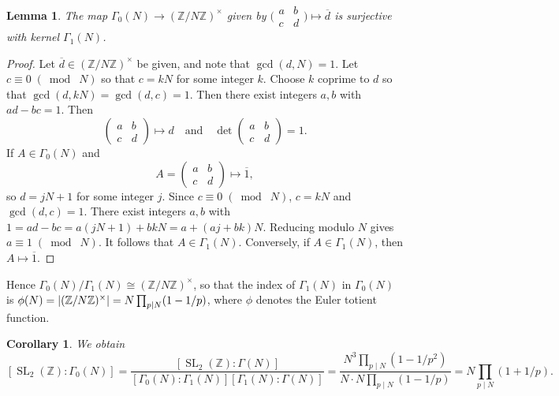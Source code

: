 \documentclass[10pt,leqno,twoside]{article}
\theoremstyle{plain}
\newtheorem{lemma}[lem]{Lemma}
\newtheorem{corollary}[lem]{Corollary}
\theoremstyle{definition}
\numberwithin{equation}{section}
\numberwithin{lem}{section}
\DeclareMathOperator{\SL}{SL}
\newcommand{\smod}[1]{\;(\bmod\; #1)}
\newcommand{\smallabcd}{\big(\!\begin{smallmatrix}
    a & b \\ c & d
\end{smallmatrix}\!\big)}
\newcommand{\slz}{\SL_2(\mathbb{Z})}
\begin{document}
\begin{lemma}\label{lem: gamma 1 normal in gamma 0}
    The map $\varGamma_0(N)\to (\mathbb{Z}/N\mathbb{Z})^\times$ given by $\smallabcd\mapsto \overline d$ 
    is surjective with kernel $\varGamma_1(N)$.
\end{lemma}
\begin{proof}
    Let $\overline d \in (\mathbb{Z}/N\mathbb{Z})^\times$ be given, and note that $\gcd(d,N)=1$. Let $c \equiv 0\smod N$ so that $c=kN$ for some integer $k$. Choose $k$ coprime to $d$ so that $\gcd(d,kN) = \gcd(d,c) = 1$. Then there exist integers $a,b$ with $ad-bc = 1$. Then \[\begin{pmatrix}
        a & b \\ c & d
    \end{pmatrix}\mapsto d\quad\text{and}\quad \det\begin{pmatrix}
        a & b \\ c & d
    \end{pmatrix} = 1.\] 
    If $A\in \varGamma_0(N)$ and \[A = \begin{pmatrix}
        a & b \\ c & d
    \end{pmatrix}\mapsto \overline 1,\] so $d = jN+1$ for some integer $j$. Since $c\equiv 0\smod N$, $c= kN$ and $\gcd(d,c) = 1$. There exist integers $a,b$ with $1 = ad-bc = a(jN+1) + bkN = a+ (aj + bk)N$. Reducing modulo $N$ gives $a\equiv 1\smod N$. It follows that $A\in \varGamma_1(N)$. Conversely, if $A\in \varGamma_1(N)$, then $A\mapsto \overline 1$.
\end{proof}
Hence $\varGamma_0(N)/\varGamma_1(N)\cong (\mathbb{Z}/N\mathbb{Z})^\times$, so that the index of $\varGamma_1(N)$ in $\varGamma_0(N)$ is $\phi(N) = \abs{(\mathbb{Z}/N\mathbb{Z})^\times} = N\prod_{p\mid N}(1-1/p)$, where $\phi$ denotes the Euler totient function. 
\begin{corollary}
    We obtain \[[\slz : \varGamma_0(N)] = \frac{[\slz : \varGamma(N)]}{[\varGamma_0(N) : \varGamma_1(N)][\varGamma_1(N) : \varGamma(N)]} = \frac{N^3\prod_{p\mid N}(1-1/p^2)}{N\cdot N\prod_{p\mid N}(1-1/p)} = N\prod_{p\mid N}(1+1/p).\]
\end{corollary} 
\end{document}
